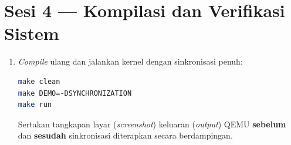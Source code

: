 \section{Sesi 4 — Kompilasi dan Verifikasi Sistem}

\begin{enumerate}

	\item \textit{Compile} ulang dan jalankan kernel dengan sinkronisasi penuh:
	      \begin{lstlisting}[language=bash, caption={Compile dan jalankan dengan sinkronisasi penuh}]
make clean
make DEMO=-DSYNCHRONIZATION
make run
    \end{lstlisting}

	      Sertakan tangkapan layar (\textit{screenshot}) keluaran (\textit{output}) QEMU \textbf{sebelum} dan \textbf{sesudah}  sinkronisasi diterapkan secara berdampingan.



\end{enumerate}
